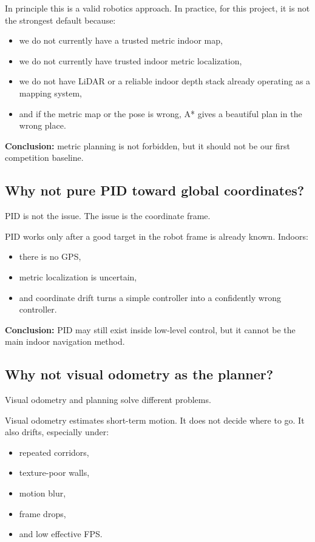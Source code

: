 \documentclass[11pt,a4paper]{article}
\begin{document}
In principle this is a valid robotics approach. In practice, for this project,
it is not the strongest default because:
\begin{itemize}[nosep]
  \item we do not currently have a trusted metric indoor map,
  \item we do not currently have trusted indoor metric localization,
  \item we do not have LiDAR or a reliable indoor depth stack already operating
        as a mapping system,
  \item and if the metric map or the pose is wrong, A* gives a beautiful plan
        in the wrong place.
\end{itemize}

\textbf{Conclusion:} metric planning is not forbidden, but it should not be our
first competition baseline.

\subsection{Why not pure PID toward global coordinates?}

PID is not the issue. The issue is the coordinate frame.

PID works only after a good target in the robot frame is already known. Indoors:
\begin{itemize}[nosep]
  \item there is no GPS,
  \item metric localization is uncertain,
  \item and coordinate drift turns a simple controller into a confidently wrong controller.
\end{itemize}

\textbf{Conclusion:} PID may still exist inside low-level control, but it cannot
be the main indoor navigation method.

\subsection{Why not visual odometry as the planner?}

Visual odometry and planning solve different problems.

Visual odometry estimates short-term motion. It does not decide where to go.
It also drifts, especially under:
\begin{itemize}[nosep]
  \item repeated corridors,
  \item texture-poor walls,
  \item motion blur,
  \item frame drops,
  \item and low effective FPS.
\end{itemize}
\end{document}
